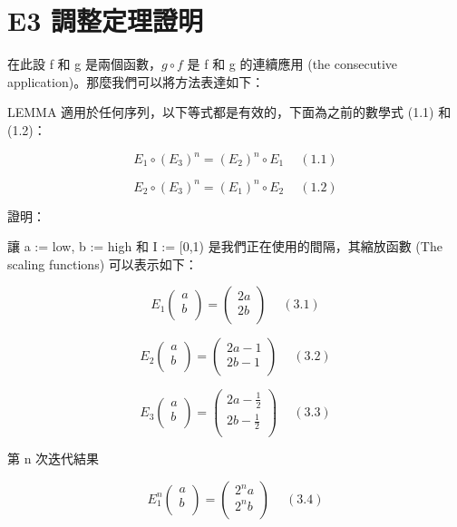 \documentclass[11pt,UTF8]{ctexart}
\begin{document}
\section{E3 調整定理證明}

在此設 f 和 g 是兩個函數，$ g \circ f $ 是 f 和 g 的連續應用 (the consecutive application)。那麼我們可以將方法表達如下：

LEMMA  適用於任何序列，以下等式都是有效的，下面為之前的數學式 (1.1) 和 (1.2)：

$$E_{1} \circ (E_{3})^n = (E_{2})^n \circ E_{1} \quad \ (1.1) $$

$$E_{2} \circ (E_{3})^n = (E_{1})^n \circ E_{2} \quad \ (1.2) $$

證明：

讓 a := low, b := high 和 I := [0,1) 是我們正在使用的間隔，其縮放函數 (The scaling functions) 可以表示如下：

$$E_1\left(\begin{matrix}a\\b\\\end{matrix}\right)=\left(\begin{matrix}2a\\2b\\\end{matrix}\right) \quad \ (3.1)$$

$$E_2\left(\begin{matrix}a\\b\\\end{matrix}\right)=\left(\begin{matrix}2a-1\\2b-1\\\end{matrix}\right) \quad \ (3.2) $$

$$E_3\left(\begin{matrix}a\\b\\\end{matrix}\right)=\left(\begin{matrix}2a-\frac{1}{2}\\2b-\frac{1}{2}\\\end{matrix}\right) \quad \ (3.3) $$

第 n 次迭代結果

$$E_1^n\left(\begin{matrix}a\\b\\\end{matrix}\right)=\left(\begin{matrix}2^na\\2^nb\\\end{matrix}\right) \quad \ (3.4) $$
\end{document}
